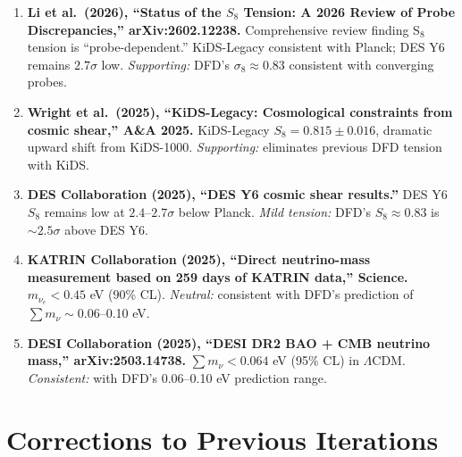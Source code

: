 \documentclass[11pt]{article}
\newcommand{\LCDM}{$\Lambda$CDM}
\begin{document}
\begin{tcolorbox}[colback=green!5!white, colframe=green!50!black,
  title=\textbf{Agent 12: NEW LITERATURE REVIEWED}]

\begin{enumerate}

\item \textbf{Li et al.\ (2026), ``Status of the $S_8$ Tension:
  A 2026 Review of Probe Discrepancies,'' arXiv:2602.12238.}
  Comprehensive review finding S$_8$ tension is ``probe-dependent.''
  KiDS-Legacy consistent with Planck; DES Y6 remains $2.7\sigma$ low.
  \emph{Supporting:} DFD's $\sigma_8 \approx 0.83$ consistent with
  converging probes.

\item \textbf{Wright et al.\ (2025), ``KiDS-Legacy: Cosmological
  constraints from cosmic shear,'' A\&A 2025.}
  KiDS-Legacy $S_8 = 0.815 \pm 0.016$, dramatic upward shift from
  KiDS-1000. \emph{Supporting:} eliminates previous DFD tension
  with KiDS.

\item \textbf{DES Collaboration (2025), ``DES Y6 cosmic shear results.''}
  DES Y6 $S_8$ remains low at $2.4$--$2.7\sigma$ below Planck.
  \emph{Mild tension:} DFD's $S_8 \approx 0.83$ is $\sim 2.5\sigma$
  above DES Y6.

\item \textbf{KATRIN Collaboration (2025), ``Direct neutrino-mass
  measurement based on 259 days of KATRIN data,'' Science.}
  $m_{\nu_e} < 0.45$ eV (90\% CL). \emph{Neutral:} consistent with
  DFD's prediction of $\sum m_\nu \sim 0.06$--0.10 eV.

\item \textbf{DESI Collaboration (2025), ``DESI DR2 BAO + CMB
  neutrino mass,'' arXiv:2503.14738.}
  $\sum m_\nu < 0.064$ eV (95\% CL) in \LCDM.
  \emph{Consistent:} with DFD's $0.06$--0.10 eV prediction range.

\end{enumerate}
\end{tcolorbox}

\section{Corrections to Previous Iterations}
\end{document}
